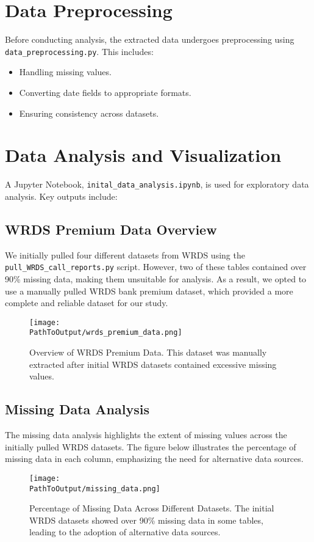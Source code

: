 \documentclass{article}
\begin{document}
\section{Data Preprocessing}
Before conducting analysis, the extracted data undergoes preprocessing using \texttt{data\_preprocessing.py}. This includes:

\begin{itemize}
    \item Handling missing values.
    \item Converting date fields to appropriate formats.
    \item Ensuring consistency across datasets.
\end{itemize}

\section{Data Analysis and Visualization}
A Jupyter Notebook, \texttt{inital\_data\_analysis.ipynb}, is used for exploratory data analysis. Key outputs include:

\subsection{WRDS Premium Data Overview}
We initially pulled four different datasets from WRDS using the \texttt{pull\_WRDS\_call\_reports.py} script. However, two of these tables contained over 90\% missing data, making them unsuitable for analysis. As a result, we opted to use a manually pulled WRDS bank premium dataset, which provided a more complete and reliable dataset for our study.

\begin{figure}[H]
    \centering
    \texttt{[image: \\PathToOutput/wrds\_premium\_data.png]}
    \caption{Overview of WRDS Premium Data. This dataset was manually extracted after initial WRDS datasets contained excessive missing values.}
\end{figure}

\subsection{Missing Data Analysis}
The missing data analysis highlights the extent of missing values across the initially pulled WRDS datasets. The figure below illustrates the percentage of missing data in each column, emphasizing the need for alternative data sources.

\begin{figure}[H]
    \centering
    \texttt{[image: \\PathToOutput/missing\_data.png]}
    \caption{Percentage of Missing Data Across Different Datasets. The initial WRDS datasets showed over 90\% missing data in some tables, leading to the adoption of alternative data sources.}
\end{figure}
\end{document}
